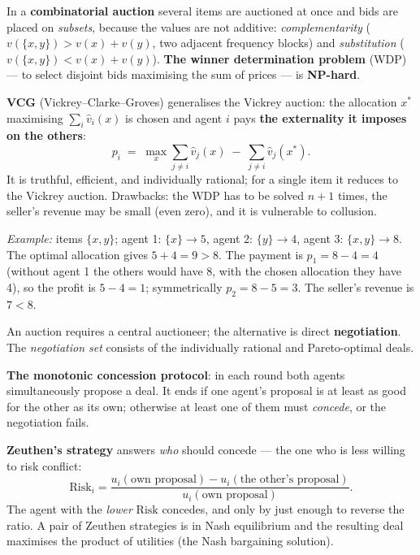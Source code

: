 \documentclass[11pt,a4paper]{article}
\theoremstyle{definition}
\begin{document}
\begin{defbox}
In a \textbf{combinatorial auction} several items are auctioned at once and bids are placed on
\emph{subsets}, because the values are not additive: \emph{complementarity}
($v(\{x,y\}) > v(x)+v(y)$, two adjacent frequency blocks) and \emph{substitution}
($v(\{x,y\}) < v(x)+v(y)$). \textbf{The winner determination problem} (WDP) --- to select
disjoint bids maximising the sum of prices --- is \textbf{NP-hard}.

\textbf{VCG} (Vickrey--Clarke--Groves) generalises the Vickrey auction: the allocation $x^*$
maximising $\sum_i \hat v_i(x)$ is chosen and agent $i$ pays \textbf{the externality it imposes
on the others}:
\[
p_i \;=\; \max_{x} \sum_{j \ne i} \hat v_j(x) \;-\; \sum_{j \ne i} \hat v_j(x^*) .
\]
It is truthful, efficient, and individually rational; for a single item it reduces to the
Vickrey auction. Drawbacks: the WDP has to be solved $n{+}1$ times, the seller's revenue may be
small (even zero), and it is vulnerable to collusion.

\emph{Example:} items $\{x,y\}$; agent 1: $\{x\}\to5$, agent 2: $\{y\}\to4$,
agent 3: $\{x,y\}\to8$. The optimal allocation gives $5+4=9 > 8$. The payment is
$p_1 = 8 - 4 = 4$ (without agent 1 the others would have 8, with the chosen allocation they have
4), so the profit is $5-4=1$; symmetrically $p_2 = 8-5 = 3$. The seller's revenue is $7 < 8$.
\end{defbox}

\begin{defbox}
An auction requires a central auctioneer; the alternative is direct \textbf{negotiation}.
The \emph{negotiation set} consists of the individually rational and Pareto-optimal deals.

\textbf{The monotonic concession protocol}: in each round both agents simultaneously propose a
deal. It ends if one agent's proposal is at least as good for the other as its own; otherwise at
least one of them must \emph{concede}, or the negotiation fails.

\textbf{Zeuthen's strategy} answers \emph{who} should concede --- the one who is less willing to
risk conflict:
\[
\mathrm{Risk}_i = \frac{u_i(\text{own proposal}) - u_i(\text{the other's proposal})}
{u_i(\text{own proposal})} .
\]
The agent with the \emph{lower} $\mathrm{Risk}$ concedes, and only by just enough to reverse the
ratio. A pair of Zeuthen strategies is in Nash equilibrium and the resulting deal maximises the
product of utilities (the Nash bargaining solution).
\end{defbox}
\end{document}
